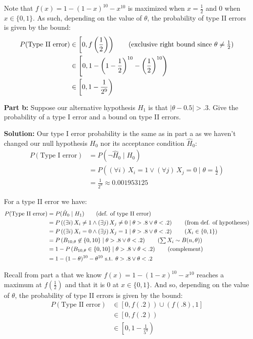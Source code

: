 \documentclass{article}
\begin{document}
Note that $f(x)=1-(1-x)^{10}-x^{10}$ is maximized when $x=\frac{1}{2}$ and 0 when $x\in\{0,1\}$. As such, depending on the value of $\theta$, the probability of type II errors is given by the bound:
\begin{align*}
    P(\text{Type II error})&\in\left[0,f\left(\frac{1}{2}\right)\right)\tag{exclusive right bound since $\theta\not=\frac{1}{2}$}\\
    &\in\left[0,1-\left(1-\frac{1}{2}\right)^{10}-\left(\frac{1}{2}\right)^{10}\right)\\
    &\in\left[0,1-\frac{1}{2^9}\right)\\
\end{align*}
\bigskip

\noindent\textbf{Part b:} Suppose our alternative hypothesis $H_1$ is that $|\theta-0.5|>.3$. Give the probability of a type I error and a bound on type II errors.
\bigskip

\noindent\textbf{Solution:} Our type I error probability is the same as in part a as we haven't changed our null hypothesis $H_0$ nor its acceptance condition $\hat H_0$:
\begin{align*}
    P(\text{Type I error})&=P(\neg\hat H_0\mid H_0)\tag{def. of type I error}\\
    &=P\left((\forall i)\,X_i=1\vee(\forall j)\,X_j=0\mid\theta=\frac{1}{2}\right)\tag{from def. of hypotheses}\\
    &=\frac{1}{2^9}\approx0.001953125\tag{part a}
\end{align*}

For a type II error we have:
\begin{align*}
    P(\text{Type II error})&=P(\hat H_0\mid H_1)\tag{def. of type II error}\\
    &=P\left((\exists i)\,X_i\not=1\wedge(\exists j)\,X_j\not=0\mid\theta>.8\vee\theta<.2\right)\tag{from def. of hypotheses}\\
    &=P\left((\exists i)\,X_i=0\wedge(\exists j)\,X_j=1\mid\theta>.8\vee\theta<.2\right)\tag{$X_i\in\{0,1\}$}\\
    &=P\left(B_{10,\theta}\not\in\{0,10\}\mid\theta>.8\vee\theta<.2\right)\tag{$\sum X_i\sim B(n,\theta)$}\\
    &=1-P\left(B_{10,\theta}\in\{0,10\}\mid\theta>.8\vee\theta<.2\right)\tag{complement}\\
    &=1-(1-\theta)^{10}-\theta^{10}\text{ s.t. }\theta>.8\vee\theta<.2
\end{align*}

Recall from part a that we know $f(x)=1-(1-x)^{10}-x^{10}$ reaches a maximum at $f\left(\frac{1}{2}\right)$ and that it is 0 at $x\in\{0,1\}$. And so, depending on the value of $\theta$, the probability of type II errors is given by the bound:
\begin{align*}
    P(\text{Type II error})&\in\left[0,f\left(.2\right)\right)\cup\left(f(.8),1\right]\tag{exclusive bounds since $\theta>.2\vee \theta<.8$}\\
    &\in\left[0,f\left(.2\right)\right)\tag{$f(x)$ is symmetric about $x=.5$ and $.5-.2=.8-.5$}\\
    &\in\left[0,1-\frac{1}{5^9}\right)\\
\end{align*}
\end{document}
